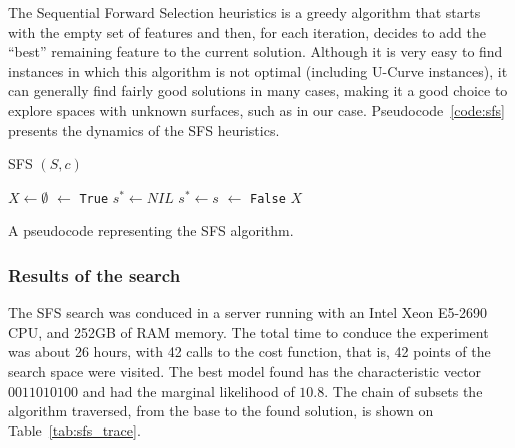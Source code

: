 The Sequential Forward Selection heuristics is a greedy algorithm that
starts with the empty set of features and then, for each iteration,
decides to add the ``best'' remaining feature to the current solution.
Although it is very easy to find instances in which this algorithm is
not optimal (including U-Curve instances), it can generally find  fairly
good solutions in many cases, making it a good choice to explore spaces
with unknown surfaces, such as in our case. Pseudocode~\ref{code:sfs}
presents the dynamics of the SFS heuristics.

\begin{algorithm}[H]
\textsc{SFS} $(S, c)$
\begin{algorithmic}[1]
    \State $X \gets \emptyset$
     $\gets$ {\tt True}
        \State $s^* \gets NIL$
                \State $s^* \gets s$
            \EndIf
        \EndFor
             $\gets$ {\tt False}
        \EndIf
    \EndWhile
    \Return $X$
\end{algorithmic}
\caption{A pseudocode representing the SFS algorithm.}
\label{code:sfs}
\end{algorithm}


\subsubsection{Results of the search}
The SFS search was conduced in a server running with an Intel 
Xeon E5-2690 CPU, and 252GB of RAM memory. The total time to conduce the
experiment was about 26 hours, with 42 calls to the cost function, that
is, 42 points of the search space were visited. The best model found has
the characteristic vector $0011010100$ and had the marginal likelihood
of $10.8$. The chain of subsets the algorithm traversed, from the base
to the found solution, is shown on Table~\ref{tab:sfs_trace}.

